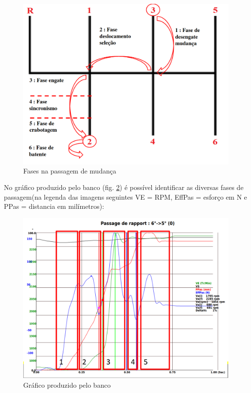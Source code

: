 \begin{figure}[H]
\centering
\includegraphics[scale=0.3]{figs/Limites_Passagem}
\caption{Fases na passagem de mudança \cite{passagemMud}}\label{fases}
\end{figure}


No gráfico produzido pelo banco (fig. \ref{fase2}) é possível identificar as diversas fases de passagem(na legenda das imagens seguintes VE = RPM, EffPas = esforço em N e PPas = distancia em milímetros):


\begin{figure}[H]
\centering
\includegraphics[scale=0.3]{figs/Limites_Passagem2}
\caption{Gráfico produzido pelo banco \cite{passagemMud}}\label{fase2}
\end{figure}



